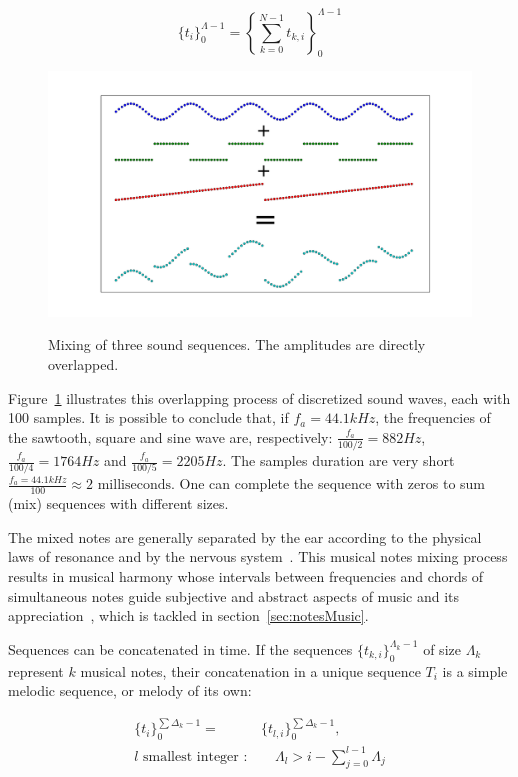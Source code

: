 \documentclass[
 aip,
 jmp,
 amsmath,amssymb,
 reprint,
]{revtex4-1}
\begin{document}
\begin{equation}\label{eq:mixagem}
\{t_i\}_0^{\Lambda-1}=\left \{ \sum_{k=0}^{N-1}t_{k,i} \right \}_0^{\Lambda-1}
\end{equation}

\begin{figure}[h!]
    {\centering
        \includegraphics[width=\columnwidth]{figures/mixagem}}
    \caption{Mixing of three sound sequences. The amplitudes are directly overlapped.}
        \label{fig:mixagem}
\end{figure}

Figure~\ref{fig:mixagem} illustrates this overlapping process of discretized sound waves, each with 100 samples. It is possible to conclude that, if $f_a=44.1kHz$, the frequencies of the sawtooth, square and sine wave are, respectively: $\frac{f_a}{100/2}=882Hz$, $\frac{f_a}{100/4}=1764Hz$ and $\frac{f_a}{100/5}=2205Hz$. The samples duration are very short $\frac{f_a=44.1kHz}{100} \approx 2 \text{ milliseconds}$. One can complete the sequence with zeros to sum (mix) sequences with different sizes.

The mixed notes are generally separated by the ear according to the physical laws of resonance and by the nervous system~\cite{Roederer}.  This musical notes mixing process results in musical harmony whose intervals between frequencies and chords of simultaneous notes guide subjective and abstract aspects of music and its appreciation~\cite{Harmonia}, which is tackled in section~\ref{sec:notesMusic}. 

Sequences can be concatenated in time. If the sequences $\{t_{k,i}\}_0^{\Lambda_k-1}$ of size $\Lambda_k$ represent $k$ musical notes, their concatenation in a unique sequence $T_i$ is a simple melodic sequence, or melody of its own:

\begin{equation}\label{eq:concatenacao}
\begin{split}
\{t_i\}_0^{\sum\Delta_k-1}= & \{t_{l,i}\}_0^{\sum\Delta_k-1}, \;\; \\ l\text{ smallest integer } : & \quad \Lambda_l > i -\sum_{j=0}^{l-1}\Lambda_j
\end{split}
\end{equation}
\end{document}
